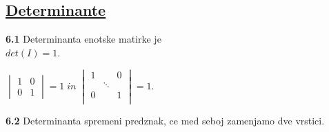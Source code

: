 \documentclass{article}
\begin{document}
\begin{multicols}{4}
	\section{\underline{Determinante}}

	\textbf{6.1} Determinanta enotske matirke je\\ $det(I) = 1$.
	\begin{center}
		\begin{math}
			\begin{vmatrix}
				1 & 0 \\
				0 & 1
			\end{vmatrix}
			= 1\; in\;
			\begin{vmatrix}
				1 &        & 0 \\
				  & \ddots &   \\
				0 &        & 1 \\
			\end{vmatrix}
			= 1.
		\end{math}
	\end{center}

	\textbf{6.2} Determinanta spremeni predznak, ce med seboj zamenjamo dve vrstici.


\end{multicols}
\end{document}
